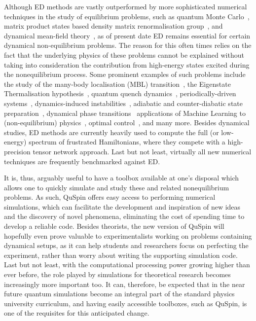 \documentclass{SciPost}
\newcommand\0{\scalebox{-1}[1]{0}}
\begin{document}
Although ED methods are vastly outperformed by more sophisticated numerical techniques in the study of equilibrium problems, such as quantum Monte Carlo~\cite{pollet_12,foulkes_01,acioli_97}, matrix product states based density matrix renormalisation group~\cite{daley_04,schollwock_05,schollwock_11}, and dynamical mean-field theory~\cite{georges_96,kotliar_06,aoki_14}, as of present date ED remains essential for certain dynamical non-equilibrium problems. The reason for this often times relies on the fact that the underlying physics of these problems cannot be explained without taking into consideration the contribution from high-energy states excited during the nonequilibrium process. Some prominent examples of such problems include the study of the many-body localisation (MBL) transition~\cite{altman2015universal,nandkishore_15,abanin_17,thomson_18,rubio2018probing}, the Eigenstate Thermalisation hypothesis~\cite{TD_review}, quantum quench dynamics~\cite{polkovnikov_11}, periodically-driven systems~\cite{goldman_14,bukov_review,eckardt_17,claeys2017breaking,claeys2017spin,vajna2017replica,weinberg_FAPT,howell2018frequency}, dynamics-induced instabilities~\cite{niu_01,creffield_09,bukov_12,citro2015dynamical,bukov_17RL,lellouch_17,naeger2018parametric,boulier2018parametric}, adiabatic and counter-diabatic state preparation~\cite{kolodrubetz_17,delcampo_13,sels_16,bukov_GSL}, dynamical phase transitions~\cite{heyl2018dynamical,de2018stochastic} applications of Machine Learning to (non-equilibrium) physics~\cite{ML_review,bukov_17RL,dunjko_17,bukov2018reinforcement}, optimal control~\cite{glaser_15,bukov_17symmbreak,day2018glassy}, and many more. Besides dynamical studies, ED methods are currently heavily used to compute the full (or low-energy) spectrum of frustrated Hamiltonians, where they compete with a high-precision tensor network approach. Last but not least, virtually all new numerical techniques are frequently benchmarked against ED.

It is, thus, arguably useful to have a toolbox available at one's disposal which allows one to quickly simulate and study these and related nonequilibrium problems. As such, QuSpin offers easy access to performing numerical simulations, which can facilitate the development and inspiration of new ideas and the discovery of novel phenomena, eliminating the cost of spending time to develop a reliable code. Besides theorists, the new version of QuSpin will hopefully even prove valuable to experimentalists working on problems containing dynamical setups, as it can help students and researchers focus on perfecting the experiment, rather than worry about writing the supporting simulation code. Last but not least, with the computational processing power growing higher than ever before, the role played by simulations for theoretical research becomes increasingly more important too. It can, therefore, be expected that in the near future quantum simulations become an integral part of the standard physics university curriculum, and having easily accessible toolboxes, such as QuSpin, is one of the requisites for this anticipated change.
\end{document}
